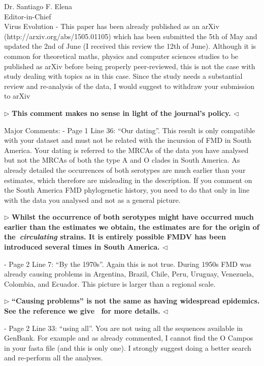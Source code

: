 \documentclass[12pt, a4paper]{letter} %
\newenvironment{reply}{$\triangleright$\bf}{$\triangleleft$}
\begin{document}
\begin{letter}{
	Dr. Santiago F. Elena\\
    Editor-in-Chief \\
    Virus Evolution
}
-       This paper has been already published as an arXiv (http://arxiv.org/abs/1505.01105) which has been submitted the 5th of May and updated the 2nd of June (I received this review the 12th of June). 
Although it is common for theoretical maths, physics and computer sciences studies to be published as arXiv before being properly peer-reviewed, this is not the case with study dealing with topics as in this case. 
Since the study needs a substantial review and re-analysis of the data, I would suggest to withdraw your submission to arXiv

\begin{reply}
This comment makes no sense in light of the journal's policy.
\end{reply}

Major Comments:
-       Page 1 Line 36: ``Our dating''. 
This result is only compatible with your dataset and must not be related with the incursion of FMD in South America. 
Your dating is referred to the MRCAs of the data you have analysed but not the MRCAs of both the type A and O clades in South America. 
As already detailed the occurrences of both serotypes are much earlier than your estimates, which therefore are misleading in the description. 
If you comment on the South America FMD phylogenetic history, you need to do that only in line with the data you analysed and not as a general picture.

\begin{reply}
Whilst the occurrence of both serotypes might have occurred much earlier than the estimates we obtain, the estimates are for the origin of the~\textit{circulating} strains.
It is entirely possible FMDV has been introduced several times in South America.
\end{reply}

-       Page 2 Line 7: ``By the 1970s''. 
Again this is not true. 
During 1950s FMD was already causing problems in Argentina, Brazil, Chile, Peru, Uruguay, Venezuela, Colombia, and Ecuador. 
This picture is larger than a regional scale.

\begin{reply}
``Causing problems'' is not the same as having widespread epidemics.
See the reference we give~\citep{Saraiva2003} for more details.
\end{reply}

-       Page 2 Line 33: ``using all''. 
You are not using all the sequences available in GenBank. 
For example and as already commented, I cannot find the O Campos in your fasta file (and this is only one). 
I strongly suggest doing a better search and re-perform all the analyses.


\end{letter}
\end{document}

